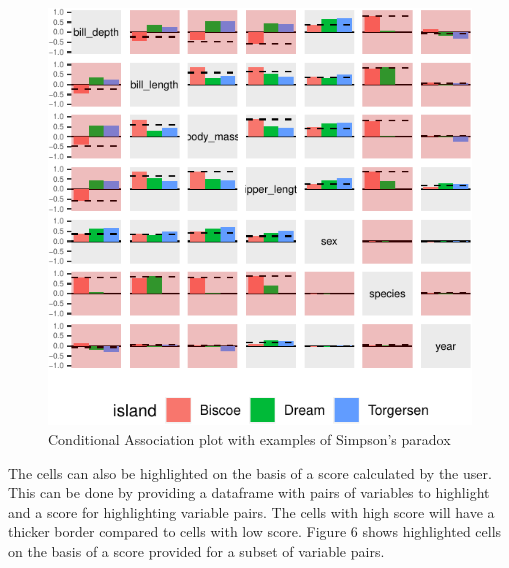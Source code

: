 \begin{Schunk}
\begin{figure}

{\centering \includegraphics{rj_paper_files/figure-latex/unnamed-chunk-12-1} 

}

\caption[Conditional Association plot with examples of Simpson's paradox]{Conditional Association plot with examples of Simpson's paradox}\label{fig:unnamed-chunk-12}
\end{figure}
\end{Schunk}

The cells can also be highlighted on the basis of a score calculated by
the user. This can be done by providing a dataframe with pairs of
variables to highlight and a score for highlighting variable pairs. The
cells with high score will have a thicker border compared to cells with
low score. Figure 6 shows highlighted cells on the basis of a score
provided for a subset of variable pairs.

